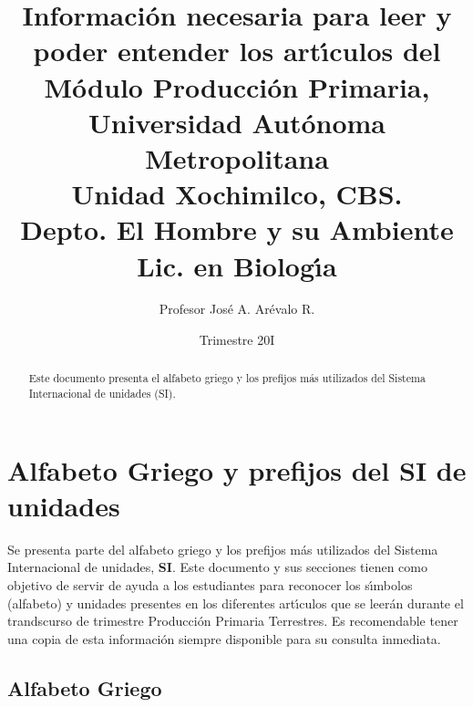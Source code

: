 \documentclass[letterpaper,spanish,12pt]{article}
\begin{document}
\title{Informaci\'{o}n necesaria para leer y poder entender los
  art\'{\i}culos del \\ 
M\'{o}dulo Producci\'{o}n Primaria, \\  
Universidad Aut\'{o}noma Metropolitana \\
Unidad Xochimilco, CBS. \\
Depto. El Hombre y su Ambiente \\
Lic. en Biolog\'{\i}a}

\author{Profesor Jos\'{e} A. Ar\'evalo R.}

\date{Trimestre 20I}

\maketitle

\begin{abstract}

Este documento presenta el alfabeto griego y los prefijos m\'{a}s
utilizados del Sistema Internacional de unidades (SI).
\end{abstract}


\section{Alfabeto Griego y prefijos del SI de unidades}

Se presenta parte del alfabeto griego y los prefijos m\'{a}s
utilizados del Sistema Internacional de unidades, \textbf{SI}. Este
documento y sus secciones tienen como objetivo de servir de ayuda a
los estudiantes para reconocer los s\'{\i}mbolos (alfabeto) y unidades
presentes en los diferentes art\'{\i}culos que se leer\'{a}n durante
el trandscurso de trimestre Producci\'{o}n Primaria Terrestres. Es
recomendable tener una copia de esta informaci\'{o}n siempre
disponible para su consulta inmediata.

\subsection*{Alfabeto Griego}
\end{document}

